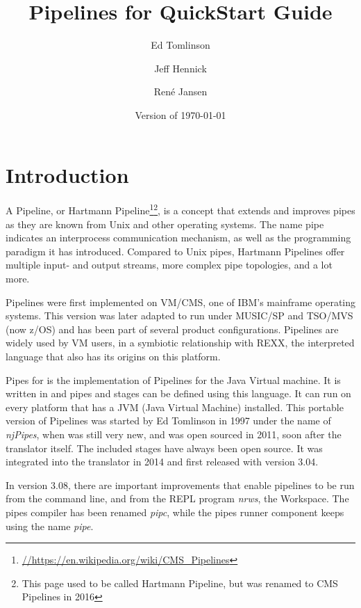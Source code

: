 

\renewcommand{\isbn}{978-90-819090-3-7}    
\setcounter{tocdepth}{1} 
\title{Pipelines for \nr{} QuickStart Guide}
\author{Ed Tomlinson \and Jeff Hennick \and René Jansen}
\date{Version  of \today}
\maketitle
{}
\pagestyle{plain}
\frontmatter
{}
\pagestyle{plain}

\tableofcontents
\newpage
{}
\frontmatter
\large


\mainmatter
\chapter{Introduction}
A Pipeline, or Hartmann
Pipeline\footnote{\url{//https://en.wikipedia.org/wiki/CMS_Pipelines}}\footnote{This
  page used to be called Hartmann Pipeline, but was renamed to CMS Pipelines
  in 2016}, is a concept that extends and improves pipes as they are known from Unix and other operating systems. The name pipe indicates an interprocess communication mechanism, as well as the programming paradigm it has introduced. Compared to Unix pipes, Hartmann Pipelines offer multiple input- and output streams, more complex pipe topologies, and a lot more.

Pipelines were first implemented on VM/CMS, one of IBM's mainframe
operating systems. This version was later adapted to run under
MUSIC/SP and TSO/MVS (now z/OS) and has been part of several product configurations. Pipelines are
widely used by VM users, in a symbiotic relationship with REXX, the
interpreted language that also has its origins on this platform.

Pipes for \nr{} is the implementation of Pipelines for the Java Virtual
machine. It is written in \nr{} and pipes and stages can be defined using this
language. It can run on every platform that has a JVM
(Java Virtual Machine) installed. This portable version of Pipelines was started
by Ed Tomlinson in 1997 under the name of \emph{njPipes}, when \nr{} was
still very new, and was open sourced in 2011, soon after the \nr{}
translator itself. The included stages have always been open source. It was integrated into the \nr{} translator in
2014 and first released with version 3.04.

In version 3.08, there are
important improvements that enable pipelines to be run from the
command line, and from the \nr{} REPL program \emph{nrws}, the
\nr{} Workspace. The pipes compiler has been renamed
\emph{pipc}, while the pipes runner component keeps using the name \emph{pipe}.

